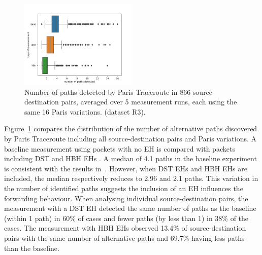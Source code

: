 \documentclass[conference]{IEEEtran}
\begin{document}


\begin{figure}[t]
\centering
  \includegraphics[width=0.5\textwidth]{boxplot-paths-detected.png}
  \caption{Number of paths detected by Paris Traceroute in 866
source-destination pairs, averaged over 5 measurement runs, each using
the same 16 Paris variations. (dataset R3).}
  \label{fig:paths-detected}
\end{figure}

Figure~\ref{fig:paths-detected} compares the distribution of the number of
alternative paths discovered by Paris Traceroute including all
source-destination pairs and Paris variations.  A baseline measurement using packets with no EH
is compared with packets including DST and HBH EHs .  
A median of 4.1 paths in the baseline experiment is consistent with the
results in~\cite{augustin2006avoiding}.  However, when DST EHs and HBH EHs are
included, the median respectively reduces to 2.96 and 2.1 paths.  
This variation in the number of identified paths suggests the inclusion of
an EH influences the forwarding behaviour.  
When analysing individual source-destination pairs, the
measurement with a DST EH detected the same number of paths as the baseline
(within 1 path) in 60\% of cases and fewer paths (by less than 1) in 38\% of
the cases.  The measurement with HBH EHs observed 13.4\%
of source-destination pairs with the same number of alternative paths and
69.7\% having less paths than the baseline.
\end{document}
